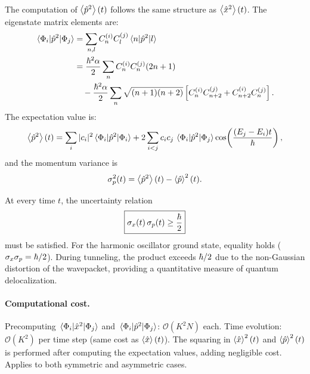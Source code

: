 The computation of $\expval{\hat{p}^2}(t)$ follows the same structure as $\expval{\hat{x}^2}(t)$.
The eigenstate matrix elements are:
\begin{align}
  \mel{\Phi_i}{\hat{p}^2}{\Phi_j}
  &= \sum_{n,l} C_n^{(i)} C_l^{(j)} \mel{n}{\hat{p}^2}{l}\notag\\
  &= \frac{\hbar^2\alpha}{2}\sum_n C_n^{(i)}C_n^{(j)}(2n+1)\notag\\
  &\quad - \frac{\hbar^2\alpha}{2}\sum_n \sqrt{(n+1)(n+2)}\left[C_n^{(i)}C_{n+2}^{(j)} + C_{n+2}^{(i)}C_n^{(j)}\right].
  \label{eq:p2_eigenstate}
\end{align}
The expectation value is:
\begin{equation}\label{eq:p2exp}
  \expval{\hat{p}^2}(t)
  = \sum_i |c_i|^2 \mel{\Phi_i}{\hat{p}^2}{\Phi_i}
  + 2\sum_{i<j} c_i c_j\,\mel{\Phi_i}{\hat{p}^2}{\Phi_j}\cos\!\left(\frac{(E_j - E_i)t}{\hbar}\right),
\end{equation}
and the momentum variance is
\begin{equation}\label{eq:sigmap}
  \sigma_p^2(t) = \expval{\hat{p}^2}(t) - \expval{\hat{p}}^2(t).
\end{equation}

\begin{result}\label{res:uncertainty}
At every time $t$, the uncertainty relation
\begin{equation}\label{eq:heisenberg}
  \boxed{\sigma_x(t)\,\sigma_p(t) \geq \frac{\hbar}{2}}
\end{equation}
must be satisfied.
For the harmonic oscillator ground state, equality holds ($\sigma_x\sigma_p = \hbar/2$).
During tunneling, the product exceeds $\hbar/2$ due to the non-Gaussian distortion of the wavepacket, providing a quantitative measure of quantum delocalization.
\end{result}

\paragraph{Computational cost.}
Precomputing $\mel{\Phi_i}{\hat{x}^2}{\Phi_j}$ and $\mel{\Phi_i}{\hat{p}^2}{\Phi_j}$: $\mathcal{O}(K^2 N)$ each.
Time evolution: $\mathcal{O}(K^2)$ per time step (same cost as $\expval{\hat{x}}(t)$).
The squaring in $\expval{\hat{x}}^2(t)$ and $\expval{\hat{p}}^2(t)$ is performed after computing the expectation values, adding negligible cost.
Applies to both symmetric and asymmetric cases.

